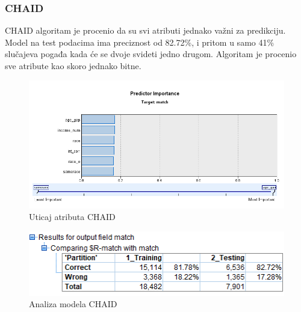 \documentclass{article}
\begin{document}
\subsubsection{CHAID}
CHAID algoritam je procenio da su svi atributi jednako važni za predikciju. Model na test podacima ima preciznost od 82.72\%, i pritom u samo 41\% slučajeva pogađa kada će se dvoje svideti jedno drugom. Algoritam je procenio sve atribute kao skoro jednako bitne.
\begin{figure}[h!]
\centering
\includegraphics[scale=0.4]{graphics/impchaid.png}
\caption{Uticaj atributa CHAID}
\label{fig:impchaid}
\end{figure}
\begin{figure}[h!]
\centering
\includegraphics[scale=0.6]{graphics/analchaid.png}
\caption{Analiza modela CHAID}
\label{fig:analchaid}
\end{figure}
\FloatBarrier
\end{document}
